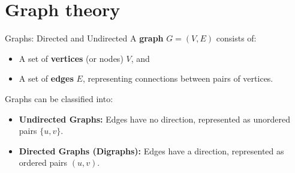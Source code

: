 \newsection
\section{Graph theory}
\begin{definition}[]{Graphs: Directed and Undirected}
    A \textbf{graph} $G = (V, E)$ consists of:
    \begin{itemize}
        \item A set of \textbf{vertices} (or nodes) $V$, and
        \item A set of \textbf{edges} $E$, representing connections between pairs of vertices.
    \end{itemize}
    Graphs can be classified into:
    \begin{itemize}
        \item \textbf{Undirected Graphs:} Edges have no direction, represented as unordered pairs $\{u, v\}$.
        \item \textbf{Directed Graphs (Digraphs):} Edges have a direction, represented as ordered pairs $(u, v)$.
    \end{itemize}
\end{definition}

